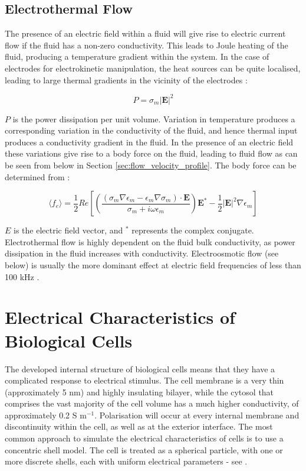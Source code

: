 \subsection{Electrothermal Flow}

The presence of an electric field within a fluid will give rise to electric current flow if the fluid has a non-zero conductivity. This leads to Joule heating of the fluid, producing a temperature gradient within the system. In the case of electrodes for electrokinetic manipulation, the heat sources can be quite localised, leading to large thermal gradients in the vicinity of the electrodes \citep{Ramos:1998}:

\begin{equation}
 P = \sigma_{m} |\textbf{E}|^{2}
\label{eqn:joule_heating}
\end{equation}

$P$ is the power dissipation per unit volume. Variation in temperature produces a corresponding variation in the conductivity of the fluid, and hence thermal input produces a conductivity gradient in the fluid. In the presence of an electric field these variations give rise to a body force on the fluid, leading to fluid flow as can be seen from  below in Section \ref{sec:flow_velocity_profile}. The body force can be determined from \citep{Chen:2006}:

\begin{equation}
 \langle f_{e} \rangle = \frac{1}{2} Re \left[ \left( \frac{(\sigma_{m} \nabla \epsilon_{m} - \epsilon_{m} \nabla \sigma_{m}) \cdot \textbf{E} }{\sigma_{m} + i \omega \epsilon_{m}} \right) \textbf{E}^{*} - \frac{1}{2} |\textbf{E}|^{2} \nabla \epsilon_{m} \right]
\label{eqn:electrothermal_flow}
\end{equation}

$E$ is the electric field vector, and $^{*}$ represents the complex conjugate. Electrothermal flow is highly dependent on the fluid bulk conductivity, as power dissipation in the fluid increases with conductivity. Electroosmotic flow (see below) is usually the more dominant effect at electric field frequencies of less than 100 kHz \citep{Morgan:2003}.

\section{Electrical Characteristics of Biological Cells}
\label{sec:electrical_characteristics_of_biological_cells}
The developed internal structure of biological cells means that they have a complicated response to electrical stimulus. The cell membrane is a very thin (approximately 5 nm) and highly insulating bilayer, while the cytosol that comprises the vast majority of the cell volume has a much higher conductivity, of approximately 0.2 S m$^{-1}$. Polarisation will occur at every internal membrane and discontinuity within the cell, as well as at the exterior interface. The most common approach to simulate the electrical characteristics of cells is to use a concentric shell model. The cell is treated as a spherical particle, with one or more discrete shells, each with uniform electrical parameters - see .

